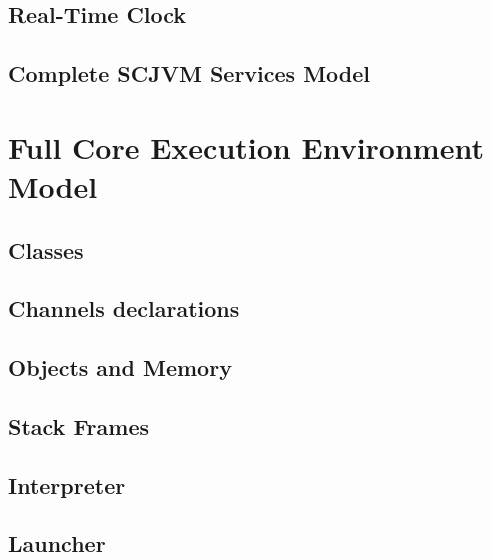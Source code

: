 \documentclass[a4paper,10pt]{report}
\begin{document}
\section{Real-Time Clock}


\section{Complete SCJVM Services Model}


\chapter{Full Core Execution Environment Model}
\label{full-cee-model}

\section{Classes}


\section{Channels declarations}
\label{cee-model-channels}





\section{Objects and Memory}


\section{Stack Frames}


\section{Interpreter}





\section{Launcher}
\label{launcher-appendix}

\end{document}
